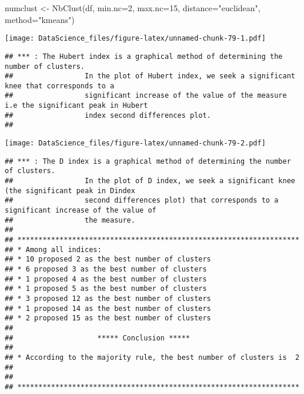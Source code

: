 \documentclass[
]{book}
\newenvironment{Shaded}{\begin{snugshade}}{\end{snugshade}}
\newcommand{\AttributeTok}[1]{\textcolor[rgb]{0.77,0.63,0.00}{#1}}
\newcommand{\DecValTok}[1]{\textcolor[rgb]{0.00,0.00,0.81}{#1}}
\newcommand{\FunctionTok}[1]{\textcolor[rgb]{0.00,0.00,0.00}{#1}}
\newcommand{\NormalTok}[1]{#1}
\newcommand{\OtherTok}[1]{\textcolor[rgb]{0.56,0.35,0.01}{#1}}
\newcommand{\SpecialCharTok}[1]{\textcolor[rgb]{0.00,0.00,0.00}{#1}}
\newcommand{\StringTok}[1]{\textcolor[rgb]{0.31,0.60,0.02}{#1}}
\begin{document}
\begin{Shaded}
\begin{Highlighting}[]
\NormalTok{numclust }\OtherTok{\textless{}{-}} \FunctionTok{NbClust}\NormalTok{(df, }\AttributeTok{min.nc=}\DecValTok{2}\NormalTok{, }\AttributeTok{max.nc=}\DecValTok{15}\NormalTok{, }\AttributeTok{distance=}\StringTok{"euclidean"}\NormalTok{, }\AttributeTok{method=}\StringTok{"kmeans"}\NormalTok{)}
\end{Highlighting}
\end{Shaded}

\texttt{[image: DataScience\_files/figure-latex/unnamed-chunk-79-1.pdf]}

\begin{verbatim}
## *** : The Hubert index is a graphical method of determining the number of clusters.
##                 In the plot of Hubert index, we seek a significant knee that corresponds to a 
##                 significant increase of the value of the measure i.e the significant peak in Hubert
##                 index second differences plot. 
## 
\end{verbatim}

\texttt{[image: DataScience\_files/figure-latex/unnamed-chunk-79-2.pdf]}

\begin{verbatim}
## *** : The D index is a graphical method of determining the number of clusters. 
##                 In the plot of D index, we seek a significant knee (the significant peak in Dindex
##                 second differences plot) that corresponds to a significant increase of the value of
##                 the measure. 
##  
## ******************************************************************* 
## * Among all indices:                                                
## * 10 proposed 2 as the best number of clusters 
## * 6 proposed 3 as the best number of clusters 
## * 1 proposed 4 as the best number of clusters 
## * 1 proposed 5 as the best number of clusters 
## * 3 proposed 12 as the best number of clusters 
## * 1 proposed 14 as the best number of clusters 
## * 2 proposed 15 as the best number of clusters 
## 
##                    ***** Conclusion *****                            
##  
## * According to the majority rule, the best number of clusters is  2 
##  
##  
## *******************************************************************
\end{verbatim}

\begin{Shaded}
\end{Shaded}
\end{document}
